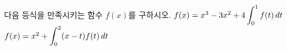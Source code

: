 다음 등식을 만족시키는 함수 $f(x)$를 구하시오.
 $f(x)=x^3-3x^2+4\displaystyle\int_{0}^{1}f(t)\mkern3mu dt$
 $f(x)=x^2+\displaystyle\int_{0}^{2}(x-t)f(t)\mkern3mu dt$
